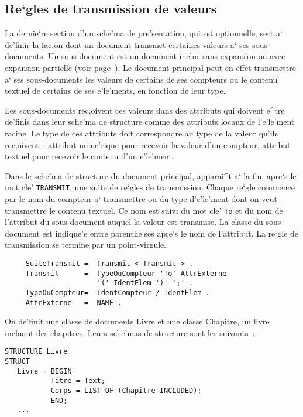 {\subsection{Re`gles de transmission de valeurs}

La dernie`re section d'un sche'ma de pre'sentation, qui est optionnelle,
sert a` de'finir la fac,on dont un document transmet certaines valeurs
a` ses sous-documents. Un sous-document est un document inclus sans
expansion ou avec expansion partielle (voir page~\pageref{inclusion}).
Le document principal peut en effet transmettre a` ses sous-documents
les valeurs de certains de ses compteurs ou le contenu textuel de certains
de ses e'le'ments, en fonction de leur type.

Les sous-documents rec,oivent ces valeurs dans des attributs qui doivent
e^tre de'finis dans leur sche'ma de structure comme des attributs locaux
de l'e'le'ment racine. Le type de ces attributs doit correspondre au type
de la valeur qu'ils rec,oivent~: attribut nume'rique pour recevoir la
valeur d'un compteur, attribut textuel pour recevoir le contenu d'un
e'le'ment.

Dans le sche'ma de structure du document principal, apparai^t a` la fin,
apre`s le mot cle' {\tt TRANSMIT}, une suite de re`gles de transmission.
Chaque re`gle commence par le nom du compteur a` transmettre ou du type
d'e'le'ment dont on veut transmettre le contenu textuel. Ce nom est suivi
du mot cle' {\tt To} et du nom de l'attribut du sous-document auquel la
valeur est transmise. La classe du sous-document est indique'e entre
parenthe`ses apre`s le nom de l'attribut. La re`gle de transmission se
termine par un point-virgule.

\begin{verbatim}
     SuiteTransmit =  Transmit < Transmit > .
     Transmit      =  TypeOuCompteur 'To' AttrExterne
                      '(' IdentElem ')' ';' .
     TypeOuCompteur=  IdentCompteur / IdentElem .
     AttrExterne   =  NAME .
\end{verbatim}

\begin{example}

On de'finit une classe de documents Livre et une classe Chapitre, un livre
incluant des chapitres. Leurs sche'mas de structure sont les suivants~:

\begin{verbatim}
STRUCTURE Livre
STRUCT
   Livre = BEGIN
           Titre = Text;
           Corps = LIST OF (Chapitre INCLUDED);
           END;
   ...


\end{verbatim}
\end{example}}
